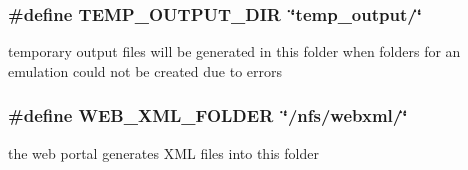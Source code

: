 \subsubsection[{TEMP\_\-OUTPUT\_\-DIR}]{\setlength{\rightskip}{0pt plus 5cm}\#define TEMP\_\-OUTPUT\_\-DIR~\char`\"{}temp\_\-output/\char`\"{}}\label{group____useful__macro_g13d8f3ae0d419c0b5de8b1d746986952}


temporary output files will be generated in this folder when folders for an emulation could not be created due to errors 

\subsubsection[{WEB\_\-XML\_\-FOLDER}]{\setlength{\rightskip}{0pt plus 5cm}\#define WEB\_\-XML\_\-FOLDER~\char`\"{}/nfs/webxml/\char`\"{}}\label{group____useful__macro_g03306edded653a2fc4419653004d1f33}


the web portal generates XML files into this folder 

